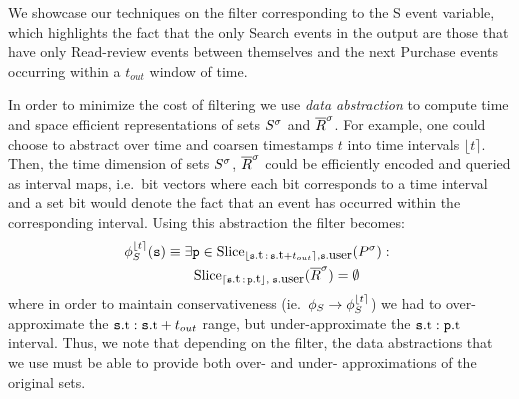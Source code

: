 \newcommand{\NotExistsP}{\ident{NotExistsP}}
\newcommand{\PrecedesP}{\precs{S}}
\newcommand{\PrecedesPP}{\omega_S}
\newcommand{\PrecedesPPP}{\psi_S}
\newcommand{\PrecedesPPPP}{\upsilon_S}


\newcommand{\interval}[1]{\lfloor #1 \rceil}
\newcommand{\uinterval}[1]{\lceil #1 \rfloor}
\newcommand{\hashid}[1]{\# #1}

We showcase our techniques on the filter corresponding to the S event variable,
which highlights the fact that the only Search events in the output are those  
that have only Read-review events between themselves and the next Purchase 
events occurring within a $t_{out}$ window of time.

In order to minimize the cost of filtering we use {\em data abstraction} to 
compute time and space efficient representations of sets ${S}^{\sigma}$ and 
${\overline{R}}^{\sigma}$.
For example, one could choose to abstract over time and coarsen timestamps $t$
into time intervals $\interval{t}$. 
Then, the time dimension of sets ${S}^{\sigma}$, ${\overline{R}}^{\sigma}$ could be efficiently 
encoded and queried as interval maps, i.e.\ bit vectors where each bit 
corresponds to a time interval and a set bit would denote the fact that an 
event has occurred within the corresponding interval.
Using this abstraction the filter becomes:
\begin{align*}
\PrecedesP^{\interval{t}}(\symv{s}) 
&\equiv  
\exists \symv{p} \in 
\slice{\syms{P}}
{\interval{\facc{\symv{s}}{t}\,:\,\facc{\symv{s}}{t} + t_{out}},
	\facc{\symv{s}}{user}} :\ 
\\
&\qquad
\slice{\syms{\oR}}
{\uinterval{\facc{\symv{s}}{t}\,:\,\facc{\symv{p}}{t}},\; 
 \facc{\symv{s}}{user}}
= \emptyset 
\end{align*}
where in order to maintain conservativeness (ie.\
$\PrecedesP \rightarrow \PrecedesP^{\interval{t}} $) we had to
over-approximate the $\facc{\symv{s}}{t}:\facc{\symv{s}}{t} + t_{out}$ 
range, but under-approximate the
$\facc{\symv{s}}{t}:\facc{\symv{p}}{t}$ interval.
Thus, we note that depending on the filter, the data abstractions that we
use must be able to provide both over- and under- approximations of the original
sets. 
  

